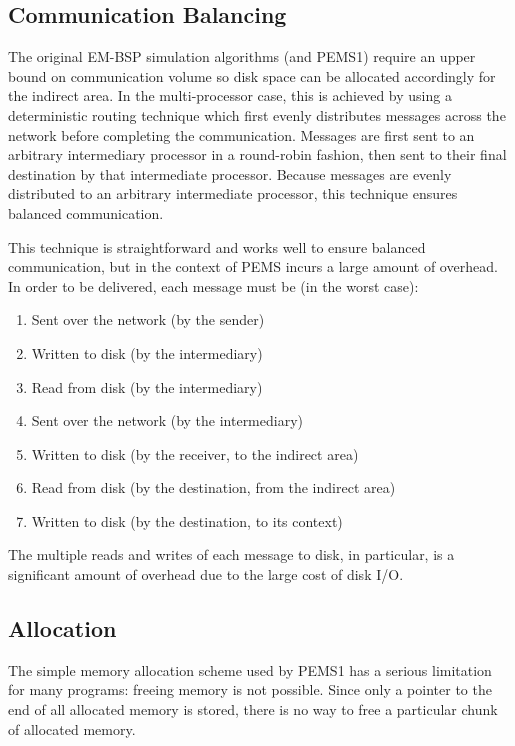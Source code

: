 \documentclass[12pt]{carletoncsthesis}
\begin{document}
\subsection{Communication Balancing}
\label{pems1-balancing}


The original EM-BSP simulation algorithms (and PEMS1) require an upper
bound on communication volume so disk space can be allocated accordingly
for the indirect area.  In the multi-processor case, this is achieved by
using a deterministic routing technique \cite{balancing} which first evenly
distributes messages across the network before completing the communication.
Messages are first sent to an arbitrary intermediary processor in a round-robin
fashion, then sent to their final destination by that intermediate processor.
Because messages are evenly distributed to an arbitrary intermediate processor,
this technique ensures balanced communication.

This technique is straightforward and works well to ensure balanced
communication, but in the context of PEMS incurs a large amount of overhead.
In order to be delivered, each message must be (in the worst case):
\begin{enumerate}
\item Sent over the network (by the sender)
\item Written to disk (by the intermediary)
\item Read from disk (by the intermediary)
\item Sent over the network (by the intermediary)
\item Written to disk (by the receiver, to the indirect area)
\item Read from disk (by the destination, from the indirect area)
\item Written to disk (by the destination, to its context)
\end{enumerate}

The multiple reads and writes of each message to disk, in particular, is a
significant amount of overhead due to the large cost of disk I/O.

\subsection{Allocation}
\label{improvements-alloc}


The simple memory allocation scheme used by PEMS1 has a serious limitation
for many programs: freeing memory is not possible.  Since only a pointer
to the end of all allocated memory is stored, there is no way to free a
particular chunk of allocated memory.
\end{document}
